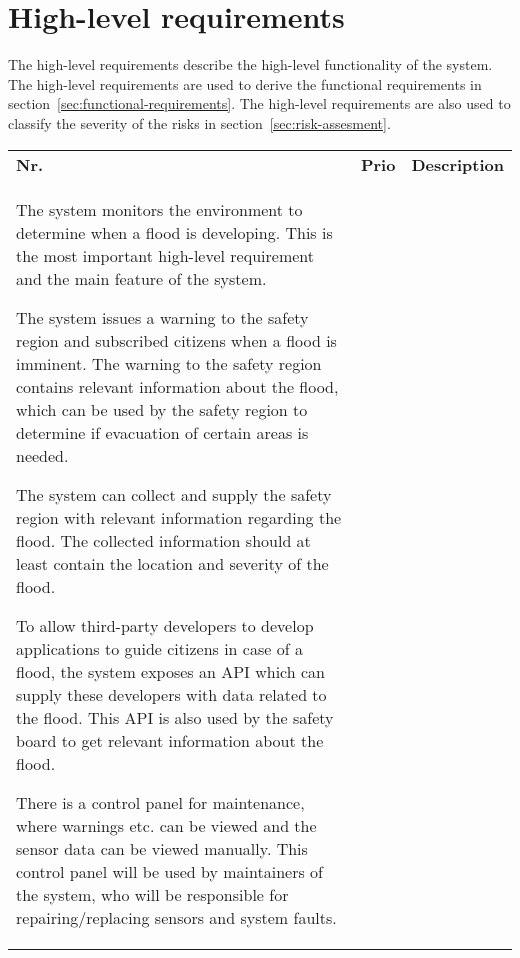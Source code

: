 
\clearpage
\section{High-level requirements}

The high-level requirements describe the high-level functionality of the system. The high-level requirements are used to derive the functional requirements in section~\ref{sec:functional-requirements}. The high-level requirements are also used to classify the severity of the risks in section~\ref{sec:risk-assesment}.

\begin{longtable}{L{0.1\textwidth} L{0.12\textwidth} L{0.78\textwidth}}

    \textbf{Nr.} & \textbf{Prio}  & \textbf{Description} \\
    
    { The system monitors the environment to determine when a flood is developing. This is the most important high-level requirement and the main feature of the system. }
    
    { The system issues a warning to the safety region and subscribed citizens when a flood is imminent. The warning to the safety region contains relevant information about the flood, which can be used by the safety region to determine if evacuation of certain areas is needed. }
    
    { The system can collect and supply the safety region with relevant information regarding the flood. The collected information should at least contain the location and severity of the flood. }
    
    { To allow third-party developers to develop applications to guide citizens in case of a flood, the system exposes an API which can supply these developers with data related to the flood. This API is also used by the safety board to get relevant information about the flood. }
    
    { There is a control panel for maintenance, where warnings etc. can be viewed and the sensor data can be viewed manually. This control panel will be used by maintainers of the system, who will be responsible for repairing/replacing sensors and system faults. }
    
    \bottomrule
    
\end{longtable}
